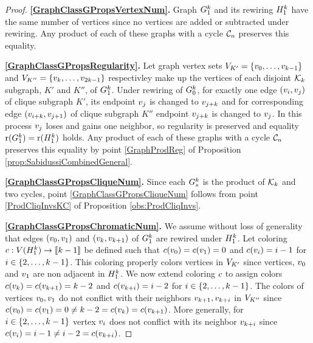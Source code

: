 \begin{proof}
     \textbf{\ref{GraphClassGPropsVertexNum}.}
     Graph $G_1^k$ and its rewiring $H_1^k$ have the same number of vertices since no vertices are added or subtracted under rewiring. Any product of each of these graphs with a cycle $\mathcal{C}_n$ preserves this equality.
    
    \textbf{\ref{GraphClassGPropsRegularity}.}
    Let graph vertex sets $V_{K'}=\{v_0, \ldots, v_{k-1}\}$ and $V_{K''}=\{v_k, \ldots, v_{2k-1}\}$ respectivley make up the vertices of each disjoint $\mathcal{K}_k$ subgraph, $K'$ and $K''$, of $G_1^k$.
    Under rewiring of $G_0^k$, for exactly one edge $(v_i,v_j)$ of clique subgraph $K'$, its endpoint $v_j$ is changed to $v_{j+k}$ and for corresponding edge $(v_{i+k},v_{j+1})$ of clique subgraph $K''$ endpoint $v_{j+k}$ is changed to $v_{j}$. In this process $v_j$ loses and gains one neighbor, so regularity is preserved and equality $\mathrm{r}(G_1^k)=\mathrm{r}(H_1^k)$ holds. Any product of each of these graphs with a cycle $\mathcal{C}_n$ preserves this equality by point \ref{GraphProdReg} of Proposition \ref{prop:SabidussiCombinedGeneral}.
    
    \textbf{\ref{GraphClassGPropsCliqueNum}.} 
    Since each $G_s^k$ is the product of $\mathcal{K}_k$ and two cycles, point \ref{GraphClassGPropsCliqueNum} follows from point \ref{ProdCliqInvsKC} of Proposition \ref{obs:ProdCliqInvs}.

    \textbf{\ref{GraphClassGPropsChromaticNum}.}
    We assume without loss of generality that edges $(v_0, v_1)$ and $(v_k, v_{k+1})$ of $G_1^k$ are rewired under $H_1^k$. Let coloring $c: V(H_1^k) \rightarrow \llbracket k-1 \rrbracket$ be defined such that $c(v_0) = c(v_1) = 0$ and $c(v_i) = i-1$ for $i \in \{2, \ldots, k-1\}$. This coloring properly colors vertices in $V_{K'}$ since vertices, $v_0$ and $v_1$ are non adjacent in $H_1^k$. We now extend coloring $c$ to assign colors $c(v_{k}) = c(v_{k+1}) = k-2$ and $c(v_{k + i}) = i-2$ for $i \in \{2, \ldots, k-1\}$. The colors of vertices $v_0,v_1$ do not conflict with their neighbors $v_{k+1},v_{k + i}$ in $V_{K''}$ since $c(v_0) = c(v_1) = 0 \neq k-2 =c(v_{k}) = c(v_{k+1})$. More generally, for $i \in \{2, \ldots, k-1\}$ vertex $v_i$ does not conflict with its neighbor $v_{k+i}$ since $c(v_i) = i-1\neq i-2 = c(v_{k + i})$.
\end{proof}

